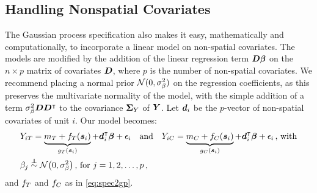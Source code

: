 \subsection{Handling Nonspatial Covariates}
\label{sec:covariates}

The Gaussian process specification also makes it easy, mathematically and computationally, to incorporate a linear model on non-spatial covariates.
The models are modified by the addition of the linear regression term \(\bm{D} \bm{\beta}\) on the \(n \times p\) matrix of covariates \(\bm{D}\), where \(p\) is the number of non-spatial covariates.
We recommend placing a normal prior \(\operatorname{\mathcal{N}}(0,\sigma_{\beta}^2)\) on the regression coefficients, as this preserves the multivariate normality of the model, with the simple addition of a term \(\sigma_\beta^2 \bm{D} \bm{D}^{\intercal}\) to the covariance \(\bm{\Sigma}_Y\) of \(\bm{Y}\).
Let \(\bm{d}_i\) be the \(p\)-vector of non-spatial covariates of unit \(i\).
Our model becomes:
\begin{equation}
    \begin{split}
        & Y_{i\treat} = \underbrace{m_\treat{} + f_\treat{}(\svec_i)}_{g_\treat{}(\svec_i)} + \dvec_i\trans \betavec + \epsilon_i \quad\text{and}\quad
        Y_{i\ctrol} = \underbrace{m_\ctrol{} + f_\ctrol{}(\svec_i)}_{g_\ctrol{}(\svec_i)} + \dvec_i\trans \betavec + \epsilon_i \,\text{, with} \\
        & \beta_j \overset{\indep}{\sim} \normal\del{0,\sigmabeta^2}\,\text{, for }j=1,2,\dotsc,p \,,
    \end{split}
    \label{eq:covariates_model}
\end{equation}
and \(f_T\) and \(f_C\) as in \autoref{eq:spec2gp}.

